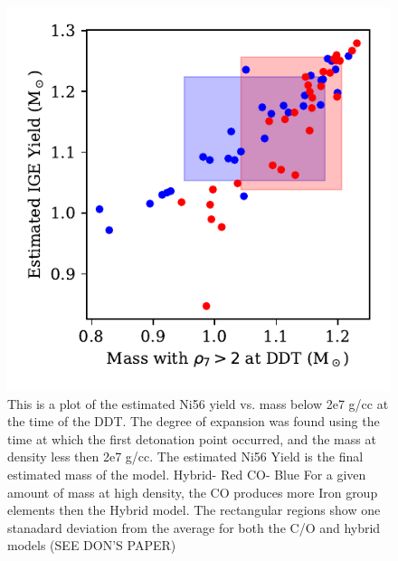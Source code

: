 \documentclass[iop,apj]{emulateapj}
\begin{document}
\begin{figure}
\includegraphics[width=\columnwidth]{figures/ni56_yield_vs_mass_at_high_dens.pdf}
\caption{\label{fig:masshighdens}
This is a plot of the estimated Ni56 yield vs. mass below 2e7 g/cc at the time of the DDT. 
The degree of expansion was found using the time at which the first detonation point occurred, and the mass at density less then 2e7 g/cc. The estimated Ni56 Yield is the final estimated mass of the model. 
Hybrid- Red
CO- Blue
For a given amount of mass at high density, the CO produces more Iron group elements then the Hybrid model.  
The rectangular regions show one stanadard deviation from the average for both the C/O and hybrid 
models (SEE DON'S PAPER)
}
\end{figure}
\end{document}
